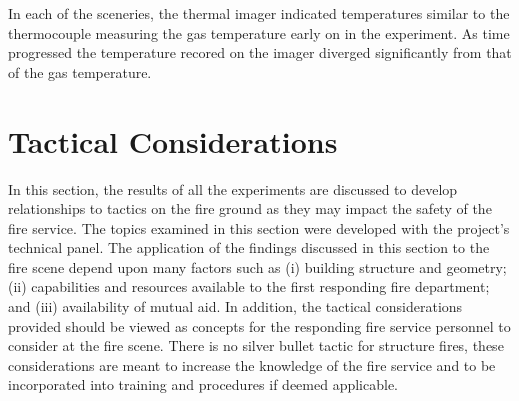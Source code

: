 \documentclass[12pt,oneside]{book}
\begin{document}

In each of the sceneries, the thermal imager indicated temperatures similar to the thermocouple measuring the gas temperature early on in the experiment. As time progressed the temperature recored on the imager diverged significantly from that of the gas temperature. 

\clearpage

\chapter{Tactical Considerations}

In this section, the results of all the experiments are discussed to develop relationships to tactics on the fire ground as they may impact the safety of the fire service. The topics examined in this section were developed with the project's technical panel. The application of the findings discussed in this section to the fire scene depend upon many factors such as (i) building structure and geometry; (ii) capabilities and resources available to the first responding fire department; and (iii) availability of mutual aid. In addition, the tactical considerations provided should be viewed as concepts for the responding fire service personnel to consider at the fire scene. There is no silver bullet tactic for structure fires, these considerations are meant to increase the knowledge of the fire service and to be incorporated into training and procedures if deemed applicable. 
\end{document}
